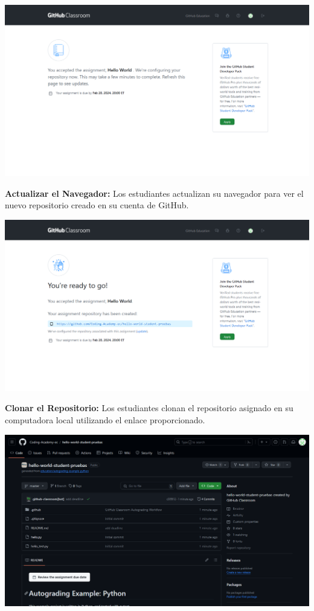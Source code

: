 \documentclass[
  a4paper,
  DIV=11,
  numbers=noendperiod,
  onepage,
  openany]{scrreprt}
\begin{document}
\begin{center}
\includegraphics{unidades/unidad0/images/paste-6.png}
\end{center}

\textbf{Actualizar el Navegador:} Los estudiantes actualizan su
navegador para ver el nuevo repositorio creado en su cuenta de GitHub.

\begin{center}
\includegraphics{unidades/unidad0/images/paste-8.png}
\end{center}

\textbf{Clonar el Repositorio:} Los estudiantes clonan el repositorio
asignado en su computadora local utilizando el enlace proporcionado.

\begin{center}
\includegraphics{unidades/unidad0/images/paste-9.png}
\end{center}
\end{document}
